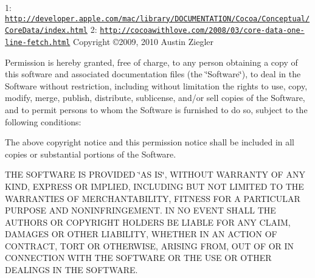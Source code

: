 1\-: \href{http://developer.apple.com/mac/library/DOCUMENTATION/Cocoa/Conceptual/CoreData/index.html}{\tt http\-://developer.\-apple.\-com/mac/library/\-D\-O\-C\-U\-M\-E\-N\-T\-A\-T\-I\-O\-N/\-Cocoa/\-Conceptual/\-Core\-Data/index.\-html} 2\-: \href{http://cocoawithlove.com/2008/03/core-data-one-line-fetch.html}{\tt http\-://cocoawithlove.\-com/2008/03/core-\/data-\/one-\/line-\/fetch.\-html} Copyright \copyright 2009, 2010 Austin Ziegler

Permission is hereby granted, free of charge, to any person obtaining a copy of this software and associated documentation files (the \char`\"{}\-Software\char`\"{}), to deal in the Software without restriction, including without limitation the rights to use, copy, modify, merge, publish, distribute, sublicense, and/or sell copies of the Software, and to permit persons to whom the Software is furnished to do so, subject to the following conditions\-:

The above copyright notice and this permission notice shall be included in all copies or substantial portions of the Software.

T\-H\-E S\-O\-F\-T\-W\-A\-R\-E I\-S P\-R\-O\-V\-I\-D\-E\-D \char`\"{}\-A\-S I\-S\char`\"{}, W\-I\-T\-H\-O\-U\-T W\-A\-R\-R\-A\-N\-T\-Y O\-F A\-N\-Y K\-I\-N\-D, E\-X\-P\-R\-E\-S\-S O\-R I\-M\-P\-L\-I\-E\-D, I\-N\-C\-L\-U\-D\-I\-N\-G B\-U\-T N\-O\-T L\-I\-M\-I\-T\-E\-D T\-O T\-H\-E W\-A\-R\-R\-A\-N\-T\-I\-E\-S O\-F M\-E\-R\-C\-H\-A\-N\-T\-A\-B\-I\-L\-I\-T\-Y, F\-I\-T\-N\-E\-S\-S F\-O\-R A P\-A\-R\-T\-I\-C\-U\-L\-A\-R P\-U\-R\-P\-O\-S\-E A\-N\-D N\-O\-N\-I\-N\-F\-R\-I\-N\-G\-E\-M\-E\-N\-T. I\-N N\-O E\-V\-E\-N\-T S\-H\-A\-L\-L T\-H\-E A\-U\-T\-H\-O\-R\-S O\-R C\-O\-P\-Y\-R\-I\-G\-H\-T H\-O\-L\-D\-E\-R\-S B\-E L\-I\-A\-B\-L\-E F\-O\-R A\-N\-Y C\-L\-A\-I\-M, D\-A\-M\-A\-G\-E\-S O\-R O\-T\-H\-E\-R L\-I\-A\-B\-I\-L\-I\-T\-Y, W\-H\-E\-T\-H\-E\-R I\-N A\-N A\-C\-T\-I\-O\-N O\-F C\-O\-N\-T\-R\-A\-C\-T, T\-O\-R\-T O\-R O\-T\-H\-E\-R\-W\-I\-S\-E, A\-R\-I\-S\-I\-N\-G F\-R\-O\-M, O\-U\-T O\-F O\-R I\-N C\-O\-N\-N\-E\-C\-T\-I\-O\-N W\-I\-T\-H T\-H\-E S\-O\-F\-T\-W\-A\-R\-E O\-R T\-H\-E U\-S\-E O\-R O\-T\-H\-E\-R D\-E\-A\-L\-I\-N\-G\-S I\-N T\-H\-E S\-O\-F\-T\-W\-A\-R\-E. 